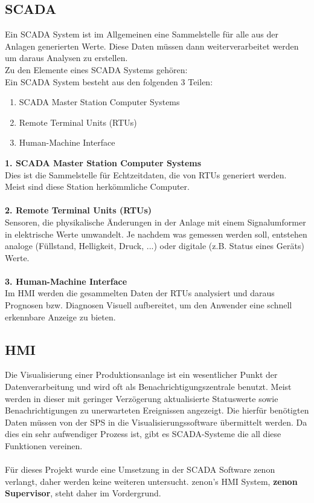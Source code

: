 \subsection{\ac{SCADA}}
Ein \ac{SCADA} System ist im Allgemeinen eine Sammelstelle für alle aus der Anlagen generierten Werte. Diese Daten müssen dann weiterverarbeitet werden um daraus Analysen zu erstellen.\\
Zu den Elemente eines \ac{SCADA} Systems gehören:\\
Ein \ac{SCADA} System besteht aus den folgenden 3 Teilen:
\begin{enumerate}
	\item \ac{SCADA} Master Station Computer Systems
	\item Remote Terminal Units (RTUs)
	\item Human-Machine Interface
\end{enumerate}

\textbf{1. \ac{SCADA} Master Station Computer Systems}\\
Dies ist die Sammelstelle für Echtzeitdaten, die von RTUs generiert werden. Meist sind diese Station herkömmliche Computer.\cite{scada_system} \\ 
\\
\textbf{2. Remote Terminal Units (RTUs)}\\
Sensoren, die physikalische Änderungen in der Anlage mit einem Signalumformer in elektrische Werte umwandelt. Je nachdem was gemessen werden soll, entstehen analoge (Füllstand, Helligkeit, Druck, ...) oder digitale (z.B. Status eines Geräts) Werte.\cite{scada_system} \\
\\
\textbf{3. Human-Machine Interface}\\
Im HMI werden die gesammelten Daten der RTUs analysiert und daraus Prognosen bzw. Diagnosen Visuell aufbereitet, um den Anwender eine schnell erkennbare Anzeige zu bieten.\cite{scada_system}

\subsection{HMI}
Die Visualisierung einer Produktionsanlage ist ein wesentlicher Punkt der Datenverarbeitung und wird oft als Benachrichtigungszentrale benutzt. Meist werden in dieser mit geringer Verzögerung aktualisierte Statuswerte sowie Benachrichtigungen zu unerwarteten Ereignissen angezeigt. Die hierfür benötigten Daten müssen von der \ac{SPS} in die Visualisierungssoftware übermittelt werden. Da dies ein sehr aufwendiger Prozess ist, gibt es \ac{SCADA}-Systeme die all diese Funktionen vereinen.\\
\\
Für dieses Projekt wurde eine Umsetzung in der \ac{SCADA} Software zenon verlangt, daher werden keine weiteren untersucht. zenon's HMI System, \textbf{zenon Supervisor}, steht daher im Vordergrund.\\
\\

